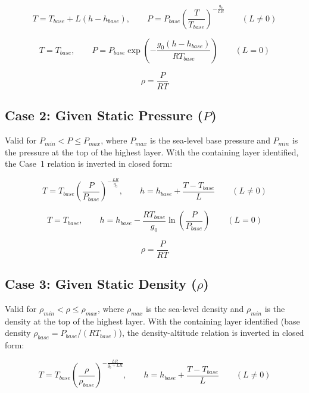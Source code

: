 \begin{equation}
T = T_{base} + L(h-h_{base}), \qquad
P = P_{base}\left(\frac{T}{T_{base}}\right)^{-\frac{g_0}{LR}} \qquad (L\neq0)
\end{equation}

\begin{equation}
T = T_{base}, \qquad
P = P_{base}\exp\left(-\frac{g_0(h-h_{base})}{RT_{base}}\right) \qquad (L=0)
\end{equation}

\begin{equation}
\rho = \frac{P}{RT}
\end{equation}

\subsection*{Case 2: Given Static Pressure ($P$)}

Valid for $P_{min} < P \le P_{max}$, where $P_{max}$ is the sea-level base
pressure and $P_{min}$ is the pressure at the top of the highest layer.
With the containing layer identified, the Case~1 relation is inverted in
closed form:

\begin{equation}
T = T_{base}\left(\frac{P}{P_{base}}\right)^{-\frac{LR}{g_0}}, \qquad
h = h_{base} + \frac{T-T_{base}}{L} \qquad (L\neq0)
\end{equation}

\begin{equation}
T = T_{base}, \qquad
h = h_{base} - \frac{RT_{base}}{g_0}\ln\left(\frac{P}{P_{base}}\right) \qquad (L=0)
\end{equation}

\begin{equation}
\rho = \frac{P}{RT}
\end{equation}

\subsection*{Case 3: Given Static Density ($\rho$)}

Valid for $\rho_{min} < \rho \le \rho_{max}$, where $\rho_{max}$ is the
sea-level density and $\rho_{min}$ is the density at the top of the
highest layer. With the containing layer identified (base density
$\rho_{base} = P_{base}/(RT_{base})$), the density-altitude relation is
inverted in closed form:

\begin{equation}
T = T_{base}\left(\frac{\rho}{\rho_{base}}\right)^{-\frac{LR}{g_0+LR}}, \qquad
h = h_{base} + \frac{T-T_{base}}{L} \qquad (L\neq0)
\end{equation}

